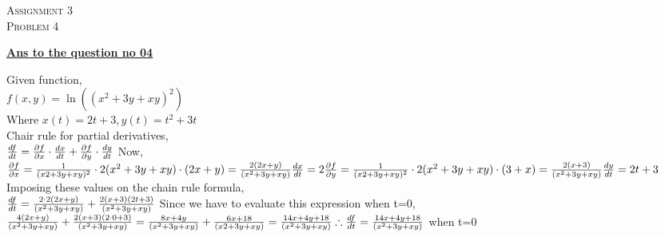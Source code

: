 \documentclass{article}
\begin{document}
\begin{newpage}
    \begin{flushright}
    \textsc{Assignment 3}\\
    \textsc{Problem 4}\\
    [1 cm]
    \end{flushright}
\begin{center}
  \textbf{\Large \underline {Ans to the question no 04}}\\
  [0.5 cm]
\end{center}
\Large {Given function, \\[2mm]
$f(x, y) = \ln((x^2 + 3y + xy)^2)$\\[2mm]
Where $x(t) = 2t+3, y(t) = t^2+3t $\\[2mm]
Chair rule for partial derivatives,\\[2mm]
$\frac{df}{dt}=\frac{\partial{f}}{\partial{x}}\cdot \frac{dx}{dt}+\frac{\partial{f}}{\partial{y}}\cdot \frac{dy}{dt}\\[2mm]$
Now,\\[2mm]
$\frac{\partial{f}}{\partial{x}}=\frac{1}{(x2 + 3y + xy)^2}\cdot 2(x^2 + 3y + xy)\cdot(2x+y)=\frac{2(2x+y)}{(x^2 + 3y + xy)}\\[2mm]
\frac{dx}{dt}=2\\[2mm]
\frac{\partial{f}}{\partial{y}}=\frac{1}{(x2 + 3y + xy)^2}\cdot 2(x^2 + 3y + xy)\cdot(3+x)=\frac{2(x+3)}{(x^2 + 3y + xy)}\\[2mm]
\frac{dy}{dt}=2t+3\\[3mm]$
Imposing these values on the chain rule formula,\\[2mm]
$\frac{df}{dt}=\frac{2\cdot2(2x+y)}{(x^2 + 3y + xy)}+\frac{2(x+3)(2t+3)}{(x^2 + 3y + xy)}\\[2mm]$
Since we have to evaluate this expression when t=0,\\[2mm]
$\frac{4(2x+y)}{(x^2 + 3y + xy)}+\frac{2(x+3)(2\cdot0+3)}{(x^2 + 3y + xy)}\\[2mm]
=\frac{8x+4y}{(x^2 + 3y + xy)}+\frac{6x+18}{(x2 + 3y + xy)}\\[2mm]
=\frac{14x+4y+18}{(x^2 + 3y + xy)}\\[2mm]
\therefore \frac{df}{dt}=\frac{14x+4y+18}{(x^2 + 3y + xy)}$ when t=0}
\end{newpage}
\end{document}
